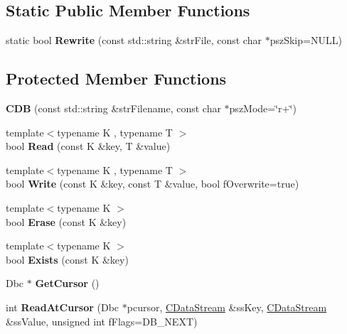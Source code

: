 \subsection*{Static Public Member Functions}
\begin{DoxyCompactItemize}
\item 
\mbox{\label{class_c_d_b_acfb8a373edb9c4cfab780fb7578b277e}} 
static bool {\bfseries Rewrite} (const std\+::string \&str\+File, const char $\ast$psz\+Skip=N\+U\+LL)
\end{DoxyCompactItemize}
\subsection*{Protected Member Functions}
\begin{DoxyCompactItemize}
\item 
\mbox{\label{class_c_d_b_aa5f2317ab28c6424bfebdaa969aa2b2c}} 
{\bfseries C\+DB} (const std\+::string \&str\+Filename, const char $\ast$psz\+Mode=\char`\"{}r+\char`\"{})
\item 
\mbox{\label{class_c_d_b_adfd2c079df629d5f7cac0ca923ffd698}} 
{\footnotesize template$<$typename K , typename T $>$ }\\bool {\bfseries Read} (const K \&key, T \&value)
\item 
\mbox{\label{class_c_d_b_a7fb5b4fa36e57e17287f2c1c762bd708}} 
{\footnotesize template$<$typename K , typename T $>$ }\\bool {\bfseries Write} (const K \&key, const T \&value, bool f\+Overwrite=true)
\item 
\mbox{\label{class_c_d_b_a3f7e1ba9dd41de3fb1525d789405a6c3}} 
{\footnotesize template$<$typename K $>$ }\\bool {\bfseries Erase} (const K \&key)
\item 
\mbox{\label{class_c_d_b_a5f7d7854dcbcec1b1f85bc6a0008563e}} 
{\footnotesize template$<$typename K $>$ }\\bool {\bfseries Exists} (const K \&key)
\item 
\mbox{\label{class_c_d_b_a5ea1cb8e2f2e9ad357d5e37619eabed2}} 
Dbc $\ast$ {\bfseries Get\+Cursor} ()
\item 
\mbox{\label{class_c_d_b_aa3f7c529fd233c106dca32845b593232}} 
int {\bfseries Read\+At\+Cursor} (Dbc $\ast$pcursor, \mbox{\hyperlink{class_c_data_stream}{C\+Data\+Stream}} \&ss\+Key, \mbox{\hyperlink{class_c_data_stream}{C\+Data\+Stream}} \&ss\+Value, unsigned int f\+Flags=D\+B\+\_\+\+N\+E\+XT)
\end{DoxyCompactItemize}
